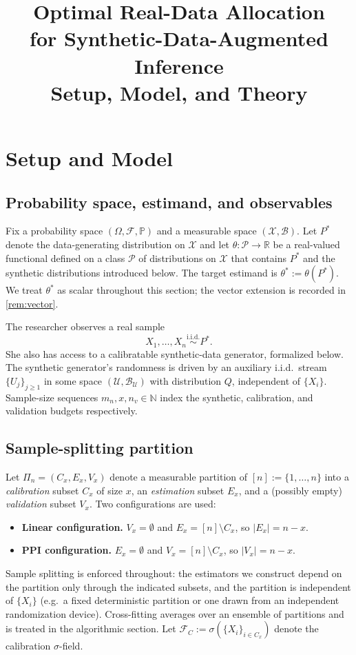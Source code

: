 \documentclass[11pt]{article}
\title{Optimal Real-Data Allocation\\for Synthetic-Data-Augmented Inference\\[0.4em]\large Setup, Model, and Theory}
\date{}
\author{}
\theoremstyle{plain}
\theoremstyle{definition}
\theoremstyle{remark}
\newcommand{\R}{\mathbb{R}}
\newcommand{\N}{\mathbb{N}}
\newcommand{\Prob}{\mathbb{P}}
\begin{document}
\maketitle

\section{Setup and Model}
\label{sec:setup}

\subsection{Probability space, estimand, and observables}
\label{ssec:probability}

Fix a probability space $(\Omega,\mathcal{F},\Prob)$ and a measurable space $(\mathcal{X},\mathcal{B})$. Let $P^*$ denote the data-generating distribution on $\mathcal{X}$ and let $\theta:\mathcal{P}\to\R$ be a real-valued functional defined on a class $\mathcal{P}$ of distributions on $\mathcal{X}$ that contains $P^*$ and the synthetic distributions introduced below. The target estimand is $\theta^* := \theta(P^*)$. We treat $\theta^*$ as scalar throughout this section; the vector extension is recorded in \cref{rem:vector}.

The researcher observes a real sample
\begin{equation}
X_1,\dots,X_n \overset{\mathrm{i.i.d.}}{\sim} P^*.
\end{equation}
She also has access to a calibratable synthetic-data generator, formalized below. The synthetic generator's randomness is driven by an auxiliary i.i.d.\ stream $\{U_j\}_{j\ge1}$ in some space $(\mathcal{U},\mathcal{B}_{\mathcal{U}})$ with distribution $Q$, independent of $\{X_i\}$. Sample-size sequences $m_n,x,n_v\in\N$ index the synthetic, calibration, and validation budgets respectively.

\subsection{Sample-splitting partition}
\label{ssec:splitting}

Let $\Pi_n=(C_x,E_x,V_x)$ denote a measurable partition of $[n]:=\{1,\dots,n\}$ into a \emph{calibration} subset $C_x$ of size $x$, an \emph{estimation} subset $E_x$, and a (possibly empty) \emph{validation} subset $V_x$. Two configurations are used:
\begin{itemize}
\item \textbf{Linear configuration.} $V_x=\emptyset$ and $E_x=[n]\setminus C_x$, so $|E_x|=n-x$.
\item \textbf{PPI configuration.} $E_x=\emptyset$ and $V_x=[n]\setminus C_x$, so $|V_x|=n-x$.
\end{itemize}
Sample splitting is enforced throughout: the estimators we construct depend on the partition only through the indicated subsets, and the partition is independent of $\{X_i\}$ (e.g.\ a fixed deterministic partition or one drawn from an independent randomization device). Cross-fitting averages over an ensemble of partitions and is treated in the algorithmic section. Let $\mathcal{F}_C:=\sigma(\{X_i\}_{i\in C_x})$ denote the calibration $\sigma$-field.
\end{document}
